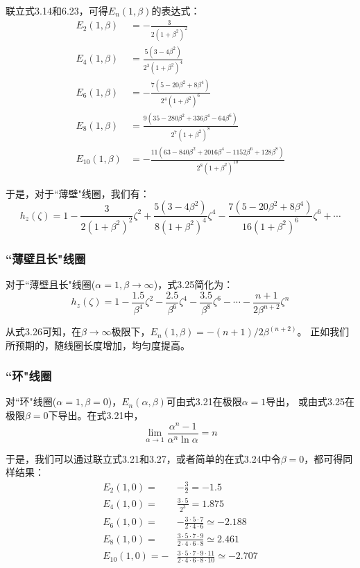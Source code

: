 联立式3.14和6.23，可得$E_n(1,\beta)$的表达式：
\begin{subequations}
\begin{align}
E_2(1,\beta) &=-\frac{3}{2(1+\beta^2)^2} \\ 
E_4(1,\beta) &= \frac{5(3-4\beta^2)}{2^3(1+\beta^2)^4} \\ 
E_6(1,\beta) &= -\frac{7(5-20\beta^2+8\beta^4)}{2^4 (1+\beta^2)^6} \\
E_8(1,\beta) &= \frac{9(35-280\beta^2+336\beta^4-64\beta^6)}{2^7(1+\beta^2)^8} \\ E_{10}(1,\beta) &= -\frac{11(63-840\beta^2+2016\beta^4-1152\beta^6+128\beta^8)}{2^8(1+\beta^2)^{10}}
\end{align}
\end{subequations}

于是，对于``薄壁"线圈，我们有：
\begin{equation}
  h_z(\zeta)=1-\frac{3}{2(1+\beta^2)^2}\zeta^2 +\frac{5(3-4\beta^2)}{8(1+\beta^2)^4}\zeta^4-\frac{7(5-20\beta^2+8\beta^4)}{16(1+\beta^2)^6}\zeta^6+\cdots
\end{equation}

\subsubsection{``薄壁且长"线圈}
对于``薄壁且长"线圈($\alpha=1,\beta\rightarrow \infty$)，式3.25简化为：
\begin{equation}
  h_z(\zeta)=1-\frac{1.5}{\beta^4}\zeta^2-\frac{2.5}{\beta^6}\zeta^4-\frac{3.5}{\beta^8}\zeta^6-\cdots-\frac{n+1}{2\beta^{n+2}}\zeta^{n}
\end{equation}

从式3.26可知，在$\beta\rightarrow \infty$极限下，$E_n(1,\beta)=-(n+1)/2\beta^{(n+2)}$。
正如我们所预期的，随线圈长度增加，均匀度提高。

\subsubsection{``环"线圈}
对``环"线圈($\alpha=1,\beta=0$)，$E_n(\alpha,\beta)$可由式3.21在极限$\alpha=1$导出，
或由式3.25在极限$\beta=0$下导出。在式3.21中，
\begin{equation}
  \lim_{\alpha\rightarrow 1}\frac{\alpha^n-1}{\alpha^n \ln\alpha}=n
\end{equation}

于是，我们可以通过联立式3.21和3.27，或者简单的在式3.24中令$\beta=0$，都可得同样结果：
\begin{subequations}
\begin{align}
E_2(1,0) =& -\frac{3}{2}=-1.5 \\ 
E_4(1,0) =& \frac{3\cdot 5}{2^3}=1.875 \\ 
E_6(1,0) =& -\frac{3\cdot 5 \cdot 7}{2\cdot 4\cdot 6}\simeq-2.188 \\ 
E_8(1,0) =&\frac{3\cdot 5 \cdot 7\cdot 9}{2\cdot 4\cdot 6\cdot 8}\simeq 2.461 \\ 
E_{10}(1,0) =-&\frac{3\cdot 5 \cdot 7\cdot 9\cdot 11}{2\cdot 4\cdot 6\cdot 8\cdot 10}\simeq -2.707
\end{align}
\end{subequations}

